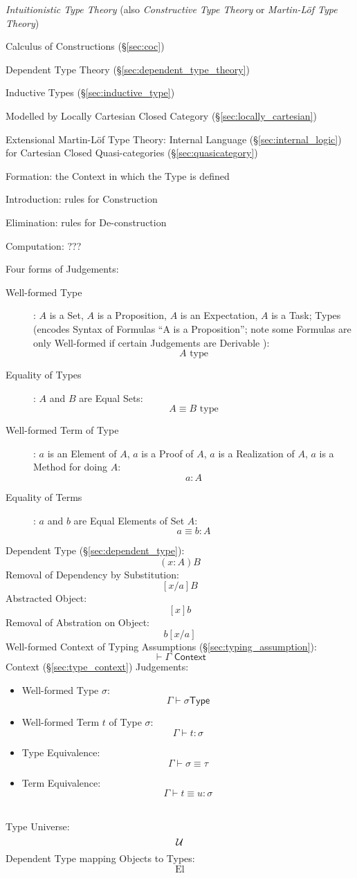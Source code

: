 \cite{martinlof84}

\emph{Intuitionistic Type Theory} (also \emph{Constructive Type
  Theory} or \emph{Martin-L\"of Type Theory})

Calculus of Constructions (\S\ref{sec:coc})

Dependent Type Theory (\S\ref{sec:dependent_type_theory})

Inductive Types (\S\ref{sec:inductive_type})

Modelled by Locally Cartesian Closed Category
(\S\ref{sec:locally_cartesian})

Extensional Martin-L\"of Type Theory: Internal Language
(\S\ref{sec:internal_logic}) for Cartesian Closed Quasi-categories
(\S\ref{sec:quasicategory})

Formation: the Context in which the Type is defined

Introduction: rules for Construction

Elimination: rules for De-construction

Computation: ???

Four forms of Judgements:
\begin{description}
  \item [Well-formed Type]: $A$ is a Set, $A$ is a Proposition, $A$ is
    an Expectation, $A$ is a Task; Types (encodes Syntax of Formulas
    ``A is a Proposition''; note some Formulas are only Well-formed if
    certain Judgements are Derivable \cite{thompson99}):
    \[
      A \text{ type}
    \]
  \item [Equality of Types]: $A$ and $B$ are Equal Sets:
    \[
      A \equiv B \text{ type}
    \]
  \item [Well-formed Term of Type]: $a$ is an Element of $A$, $a$ is a
    Proof of $A$, $a$ is a Realization of $A$, $a$ is a Method for
    doing $A$:
    \[
      a : A
    \]
  \item [Equality of Terms]: $a$ and $b$ are Equal Elements of Set $A$:
    \[
      a \equiv b : A
    \]
\end{description}

Dependent Type (\S\ref{sec:dependent_type}):
\[
  (x:A)B
\]
Removal of Dependency by Substitution:
\[
  [x/a]B
\]
Abstracted Object:
\[
  [x]b
\]
Removal of Abstration on Object:
\[
  b[x/a]
\]
Well-formed Context of Typing Assumptions
(\S\ref{sec:typing_assumption}):
\[
  \vdash \Gamma \textsf{ Context}
\]
Context (\S\ref{sec:type_context}) Judgements:
\begin {itemize}
\item Well-formed Type $\sigma$:
  \[
    \Gamma \vdash \sigma \mathsf{ Type}
  \]
\item Well-formed Term $t$ of Type $\sigma$:
  \[
    \Gamma \vdash t : \sigma
  \]
\item Type Equivalence:
  \[
    \Gamma \vdash \sigma \equiv \tau
  \]
\item Term Equivalence:
  \[
    \Gamma \vdash t \equiv u : \sigma
  \]
\end {itemize}
\hfill\\
Type Universe:
\[
  \mathcal{U}
\]
Dependent Type mapping Objects to Types:
\[
  \textrm{El}
\]


